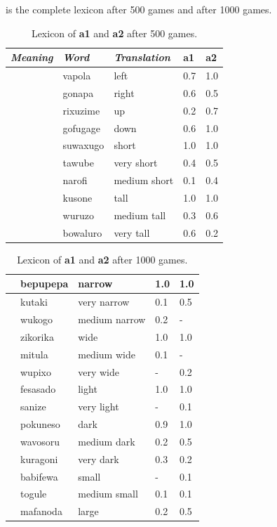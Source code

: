  is the complete lexicon after 500 games and  after 1000 games. 
\begin{table}
\begin{center}
\begin{tabular}{ l  l  l  l  l } \hline
{\it Meaning}&{\it Word}&{\it Translation} & {\bf a1}&{\bf a2} \\ \hline
[HPOS 0.0-0.5]&vapola&left &0.7&1.0\\ \hline
[HPOS 0.5-1.0]&gonapa&right &0.6&0.5\\ \hline
[VPOS 0.0-0.5]&rixuzime& up & 0.2&0.7\\ \hline
[VPOS 0.5-1.0]&gofugage& down &0.6&1.0\\ \hline
[HEIGHT 0.0-0.5]&suwaxugo&short & 1.0&1.0\\ \hline
 [HEIGHT 0.0-0.25]&tawube&very short & 0.4&0.5\\ \hline
 [HEIGHT 0.25-0.5]&narofi&medium short&0.1&0.4\\ \hline
[HEIGHT 0.5-1.0]&kusone&tall&1.0&1.0\\ \hline
 [HEIGHT 0.5-0.75]&wuruzo&medium tall&0.3&0.6\\ \hline
 [HEIGHT 0.75-1.0]&bowaluro&very tall&0.6&0.2\\ \hline
\end{tabular}
\caption{\label{tab:lex500a} Lexicon of {\bf a1} and {\bf a2} after 500 games.}
\end{center}
\end{table}

\begin{table}
\begin{center}
\begin{tabular}{ l  l  l  l  l } \hline
[WIDTH 0.0-0.5]&bepupepa&narrow & 1.0&1.0\\ \hline
 [WIDTH 0.0-0.25]&kutaki&very narrow & 0.1&0.5\\ \hline
 [WIDTH 0.25-0.5]&wukogo&medium narrow & 0.2&-\\ \hline
[WIDTH 0.5-1.0]&zikorika&wide & 1.0&1.0\\ \hline
 [WIDTH 0.5-0.75]&mitula&medium wide &0.1&-\\ \hline
 [WIDTH 0.75-1.0]&wupixo&very wide & -&0.2\\ \hline
[GRAY 0.0-0.5]&fesasado&light & 1.0&1.0\\ \hline
 [GRAY 0.0-0.25]&sanize&very light & -&0.1\\ \hline
[GRAY 0.5-1.0]&pokuneso&dark &0.9&1.0\\ \hline
 [GRAY 0.5-0.75]&wavosoru&medium dark & 0.2&0.5\\ \hline
 [GRAY 0.75-1.0]&kuragoni&very dark &0.3&0.2\\ \hline
[AREA 0.0-0.5]&babifewa&small & -&0.1\\ \hline
 [AREA 0.25-0.5]&togule&medium small & 0.1&0.1\\ \hline
[AREA 0.5-1.0]&mafanoda&large & 0.2&0.5\\ \hline
\end{tabular}
\caption{\label{tab:lex500b} Lexicon of {\bf a1} and {\bf a2} after 1000 games.}
\end{center}
\end{table}

